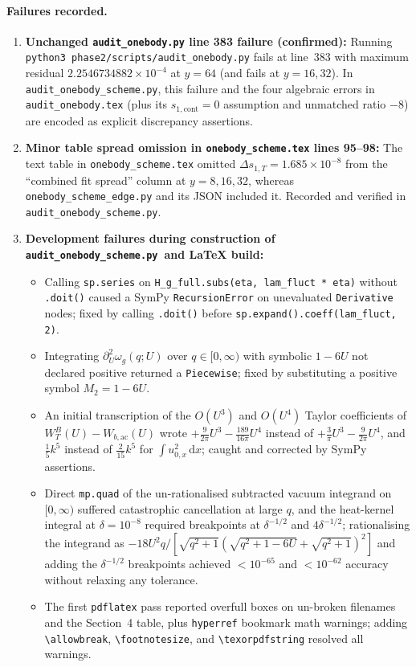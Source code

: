 \documentclass[11pt,a4paper]{article}
\newcommand{\dd}{\mathrm d}
\newcommand{\scr}{\texttt{audit\_\allowbreak onebody\_\allowbreak scheme.py}}
\begin{document}
\paragraph{Failures recorded.}
\begin{enumerate}
  \item \textbf{Unchanged \texttt{audit\_\allowbreak onebody.py} line 383 failure (confirmed):}
  Running \texttt{python3 phase2/scripts/audit\_\allowbreak onebody.py} fails at line~383 with
  maximum residual $2.2546734882\times 10^{-4}$ at $y=64$ (and fails at $y=16,32$).
  In \scr, this failure and the four algebraic errors in \texttt{audit\_\allowbreak onebody.tex}
  (plus its $s_{1,\mathrm{cont}}=0$ assumption and unmatched ratio $-8$) are encoded as
  explicit discrepancy assertions.
  \item \textbf{Minor table spread omission in \texttt{onebody\_\allowbreak scheme.tex} lines 95--98:}
  The text table in \texttt{onebody\_\allowbreak scheme.tex} omitted $\Delta s_{1,T} = 1.685\times 10^{-8}$
  from the ``combined fit spread'' column at $y=8,16,32$, whereas \texttt{onebody\_\allowbreak scheme\_\allowbreak edge.py}
  and its JSON included it. Recorded and verified in \scr.
  \item \textbf{Development failures during construction of \scr\ and LaTeX build:}
  \begin{itemize}
    \item[(a)] Calling \texttt{sp.series} on \texttt{H\_g\_full.subs(eta, lam\_fluct * eta)}
    without \texttt{.doit()} caused a SymPy \texttt{RecursionError} on unevaluated
    \texttt{Derivative} nodes; fixed by calling \texttt{.doit()} before \texttt{sp.expand().coeff(lam\_fluct, 2)}.
    \item[(b)] Integrating $\partial_U^2\omega_g(q;U)$ over $q\in[0,\infty)$ with symbolic
    $1-6U$ not declared positive returned a \texttt{Piecewise}; fixed by substituting
    a positive symbol $M_2 = 1-6U$.
    \item[(c)] An initial transcription of the $O(U^3)$ and $O(U^4)$ Taylor coefficients of
    $W_T^B(U) - W_{b,\mathrm{ac}}(U)$ wrote $+\frac{9}{2\pi}U^3 - \frac{189}{16\pi}U^4$
    instead of $+\frac{3}{\pi}U^3 - \frac{9}{2\pi}U^4$, and $\frac{1}{5}k^5$ instead of
    $\frac{2}{15}k^5$ for $\int u_{0,x}^2\,\dd x$; caught and corrected by SymPy assertions.
    \item[(d)] Direct \texttt{mp.quad} of the un-rationalised subtracted vacuum integrand on
    $[0,\infty)$ suffered catastrophic cancellation at large $q$, and the heat-kernel integral
    at $\delta = 10^{-8}$ required breakpoints at $\delta^{-1/2}$ and $4\delta^{-1/2}$;
    rationalising the integrand as $-18U^2 q/[\sqrt{q^2+1}(\sqrt{q^2+1-6U}+\sqrt{q^2+1})^2]$
    and adding the $\delta^{-1/2}$ breakpoints achieved $<10^{-65}$ and $<10^{-62}$ accuracy
    without relaxing any tolerance.
    \item[(e)] The first \texttt{pdflatex} pass reported overfull boxes on un-broken filenames
    and the Section~4 table, plus \texttt{hyperref} bookmark math warnings; adding
    \texttt{\textbackslash allowbreak}, \texttt{\textbackslash footnotesize}, and
    \texttt{\textbackslash texorpdfstring} resolved all warnings.
  \end{itemize}
\end{enumerate}
\end{document}
